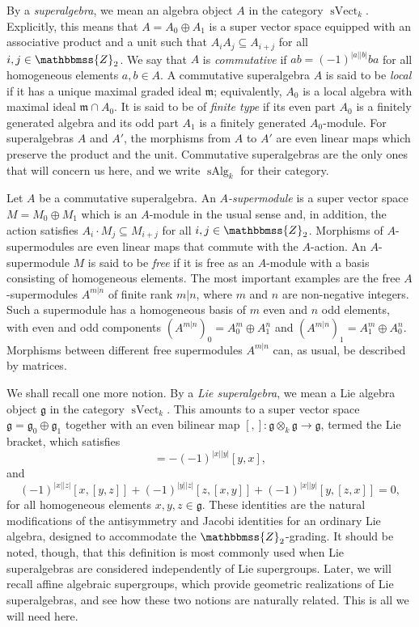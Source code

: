 \documentclass[11pt,a4paper,reqno,noamsfonts]{amsart}
\numberwithin{equation}{section}
\theoremstyle{definition}
\theoremstyle{remark}
\newcommand{\ZZ}{\ensuremath{\mathbbmss{Z}}}
\newcommand{\gfrak}{\ensuremath{\mathfrak{g}}}
\newcommand{\mfrak}{\ensuremath{\mathfrak{m}}}
\DeclareMathOperator{\sVect}{sVect}
\DeclareMathOperator{\sAlg}{sAlg}
\begin{document}
By a \emph{superalgebra}, we mean an algebra object $A$ in the category $\sVect_k$. Explicitly, this means that $A = A_0 \oplus A_1$ is a super vector space equipped with an associative product and a unit such that $A_i A_j \subseteq A_{i+j}$ for all $i,j \in \ZZ_2$. We say that $A$ is \emph{commutative} if $ab=(-1)^{\lvert a\rvert\lvert b\rvert}ba$ for all homogeneous elements $a,b \in A$. A commutative superalgebra $A$ is said to be \emph{local} if it has a unique maximal graded ideal $\mfrak$; equivalently, $A_0$ is a local algebra with maximal ideal $\mfrak \cap A_0$. It is said to be of \emph{finite type} if its even part $A_0$ is a finitely generated algebra and its odd part $A_1$ is a finitely generated $A_0$-module. For superalgebras $A$ and $A'$, the morphisms from $A$ to $A'$ are even linear maps which preserve the product and the unit. Commutative superalgebras are the only ones that will concern us here, and we write $\sAlg_k$ for their category.

Let $A$ be a commutative superalgebra. An \emph{$A$-supermodule} is a super vector space $M = M_0 \oplus M_1$ which is an $A$-module in the usual sense and, in addition, the action satisfies $A_i \cdot M_j \subseteq M_{i+j}$ for all $i,j \in \ZZ_2$. Morphisms of $A$-supermodules are even linear maps that commute with the $A$-action. An $A$-supermodule $M$ is said to be \emph{free} if it is free as an $A$-module with a basis consisting of homogeneous elements. The most important examples are the free $A$-supermodules $A^{m \vert n}$ of finite rank $m \vert n$, where $m$ and $n$ are non-negative integers. Such a supermodule has a homogeneous basis of $m$ even and $n$ odd elements, with even and odd components $(A^{m \vert n})_0 = A_0^{m} \oplus A_1^{n}$ and $(A^{m \vert n})_1 = A_1^{m} \oplus A_0^{n}$. Morphisms between different free supermodules $A^{m \vert n}$ can, as usual, be described by matrices.

We shall recall one more notion. By a \emph{Lie superalgebra}, we mean a Lie algebra object $\gfrak$ in the category $\sVect_k$. This amounts to a super vector space $\gfrak = \gfrak_0 \oplus \gfrak_1$ together with an even bilinear map $[,]\colon \gfrak \otimes_k \gfrak \to \gfrak$, termed the Lie bracket, which satisfies
\begin{equation}
[x,y] = - (-1)^{\lvert x \rvert \lvert y \rvert} [y,x],
\end{equation}
and
\begin{equation}
(-1)^{\lvert x \rvert \lvert z \rvert} [x,[y,z]] + (-1)^{\lvert y \rvert \lvert z \rvert} [z,[x,y]] + (-1)^{\lvert x \rvert \lvert y \rvert} [y,[z,x]] = 0,
\end{equation}
for all homogeneous elements $x,y,z\in\gfrak$. These identities are the natural modifications of the antisymmetry and Jacobi identities for an ordinary Lie algebra, designed to accommodate the $\ZZ_2$-grading. It should be noted, though, that this definition is most commonly used when Lie superalgebras are considered independently of Lie supergroups. Later, we will recall affine algebraic supergroups, which provide geometric realizations of Lie superalgebras, and see how these two notions are naturally related. This is all we will need here.
\end{document}

